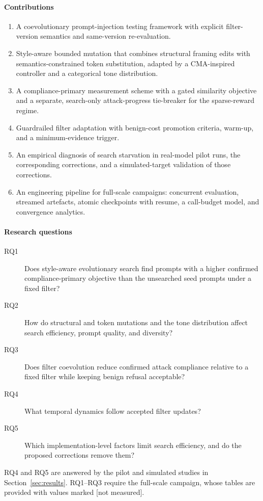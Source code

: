\documentclass[preprint,12pt,authoryear]{elsarticle}
\newcommand{\nm}{[not measured]}
\begin{document}
\paragraph{Contributions}
\begin{enumerate}
\item[(C1)] A coevolutionary prompt-injection testing framework with explicit filter-version semantics and same-version re-evaluation.
\item[(C2)] Style-aware bounded mutation that combines structural framing edits with semantics-constrained token substitution, adapted by a CMA-inspired controller and a categorical tone distribution.
\item[(C3)] A compliance-primary measurement scheme with a gated similarity objective and a separate, search-only attack-progress tie-breaker for the sparse-reward regime.
\item[(C4)] Guardrailed filter adaptation with benign-cost promotion criteria, warm-up, and a minimum-evidence trigger.
\item[(C5)] An empirical diagnosis of search starvation in real-model pilot runs, the corresponding corrections, and a simulated-target validation of those corrections.
\item[(C6)] An engineering pipeline for full-scale campaigns: concurrent evaluation, streamed artefacts, atomic checkpoints with resume, a call-budget model, and convergence analytics.
\end{enumerate}

\paragraph{Research questions}
\begin{description}
\item[RQ1] Does style-aware evolutionary search find prompts with a higher confirmed compliance-primary objective than the unsearched seed prompts under a fixed filter?
\item[RQ2] How do structural and token mutations and the tone distribution affect search efficiency, prompt quality, and diversity?
\item[RQ3] Does filter coevolution reduce confirmed attack compliance relative to a fixed filter while keeping benign refusal acceptable?
\item[RQ4] What temporal dynamics follow accepted filter updates?
\item[RQ5] Which implementation-level factors limit search efficiency, and do the proposed corrections remove them?
\end{description}
RQ4 and RQ5 are answered by the pilot and simulated studies in Section~\ref{sec:results}. RQ1--RQ3 require the full-scale campaign, whose tables are provided with values marked \nm{}.
\end{document}

